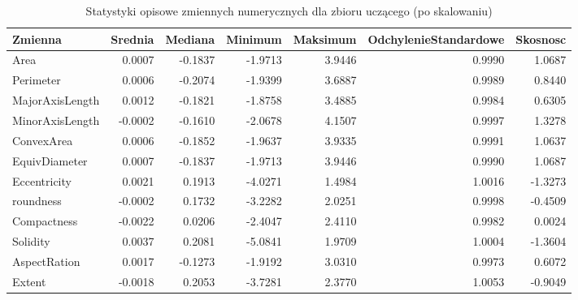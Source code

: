 \begin{table}[H]

\caption{\label{tab:statystyki-opisowe-numeryczne-scaled}Statystyki opisowe zmiennych numerycznych dla zbioru uczącego (po skalowaniu)}
\centering
\begin{tabular}[t]{lrrrrrr}
\toprule
Zmienna & Srednia & Mediana & Minimum & Maksimum & OdchylenieStandardowe & Skosnosc\\
\midrule
Area & 0.0007 & -0.1837 & -1.9713 & 3.9446 & 0.9990 & 1.0687\\
Perimeter & 0.0006 & -0.2074 & -1.9399 & 3.6887 & 0.9989 & 0.8440\\
MajorAxisLength & 0.0012 & -0.1821 & -1.8758 & 3.4885 & 0.9984 & 0.6305\\
MinorAxisLength & -0.0002 & -0.1610 & -2.0678 & 4.1507 & 0.9997 & 1.3278\\
ConvexArea & 0.0006 & -0.1852 & -1.9637 & 3.9335 & 0.9991 & 1.0637\\
\addlinespace
EquivDiameter & 0.0007 & -0.1837 & -1.9713 & 3.9446 & 0.9990 & 1.0687\\
Eccentricity & 0.0021 & 0.1913 & -4.0271 & 1.4984 & 1.0016 & -1.3273\\
roundness & -0.0002 & 0.1732 & -3.2282 & 2.0251 & 0.9998 & -0.4509\\
Compactness & -0.0022 & 0.0206 & -2.4047 & 2.4110 & 0.9982 & 0.0024\\
Solidity & 0.0037 & 0.2081 & -5.0841 & 1.9709 & 1.0004 & -1.3604\\
\addlinespace
AspectRation & 0.0017 & -0.1273 & -1.9192 & 3.0310 & 0.9973 & 0.6072\\
Extent & -0.0018 & 0.2053 & -3.7281 & 2.3770 & 1.0053 & -0.9049\\
\bottomrule
\end{tabular}
\end{table}

